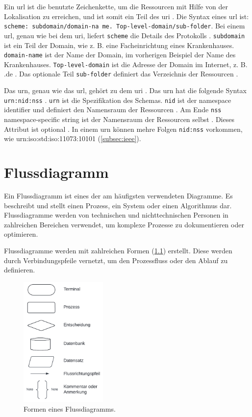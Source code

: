  Ein \acf{url} ist die benutzte Zeichenkette, um die Ressourcen mit Hilfe von der Lokalisation zu erreichen, und ist somit ein Teil des \ac{uri} \cite{uribibdiff2}. Die Syntax eines \ac{url} ist: \texttt{scheme: subdomain/domain-na me. Top-level-domain/sub-folder}. Bei einem \ac{url}, genau wie bei dem \ac{uri}, liefert \texttt{scheme} die Details des Protokolls \cite{uribibdiff}. \texttt{subdomain} ist ein Teil der Domain, wie z. B. eine Facheinrichtung eines Krankenhauses. \texttt{domain-name} ist der Name der Domain, im vorherigen Beispiel der Name des Krankenhauses. \texttt{Top-level-domain} ist die Adresse der Domain im Internet, z. B. \glqq .de\grqq{} \cite{uribibdiff}. Das optionale Teil \texttt{sub-folder} definiert das Verzeichnis der Ressourcen \cite{uribibdiff, uribibdiff2}.
 
 Das \acf{urn}, genau wie das \ac{url}, gehört zu dem \ac{uri} \cite{uribibdiff}. Das \ac{urn} hat die folgende Syntax \texttt{urn:nid:nss} \cite{uribibdiff, uribibdiff2}. \texttt{urn} ist die Spezifikation des Schemas. \texttt{nid} ist der \glqq namespace identifier\grqq{} und definiert den Namensraum der Ressourcen \cite{uribibdiff}. Am Ende \texttt{nss} \glqq namespace-specific string\grqq{} ist der Namensraum der Ressourcen selbst \cite{uribibdiff}. Dieses Attribut ist optional \cite{uribibdiff2}. In einem \ac{urn} können mehre Folgen \texttt{nid:nss} vorkommen, wie urn:iso:std:iso:11073:10101 (\ref{subsec:ieee}).

 
 \chapter{Flussdiagramm} \label{sec:flowdiagram}
 
 Ein Flussdiagramm ist eines der am häufigsten verwendeten Diagramme. Es beschreibt und stellt einen Prozess, ein System oder einen Algorithmus dar. Flussdiagramme werden von technischen und nichttechnischen Personen in zahlreichen Bereichen verwendet, um komplexe Prozesse zu dokumentieren oder optimieren.
 
 Flussdiagramme werden mit zahlreichen Formen (\ref{fig:flowdiagramappen}) erstellt. Diese werden durch Verbindungspfeile vernetzt, um den Prozessfluss oder den Ablauf zu definieren.
 
 \begin{figure}[ht]
 	\centering
 	\includegraphics[height=6.5cm]{figures/flowdiagram}
 	\caption[Formen eines Flussdiagramms]{Formen eines Flussdiagramms.}
 	\label{fig:flowdiagramappen}
 \end{figure}
